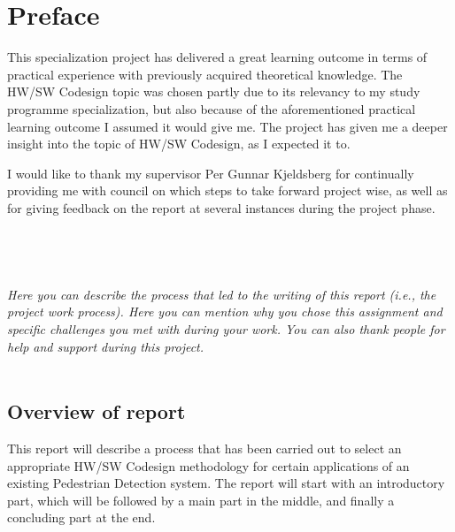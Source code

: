 \section*{Preface}
This specialization project has delivered a great learning outcome in terms of practical experience with previously acquired theoretical knowledge. The HW/SW Codesign topic was chosen partly due to its relevancy to my study programme specialization, but also because of the aforementioned practical learning outcome I assumed it would give me. The project has given me a deeper insight into the topic of HW/SW Codesign, as I expected it to.  \\
\noindent

\begin{comment}
Despite the learning outcome, the task accomplishment is less satisfactory than anticipated in terms of fulfillment of the project goals. The work process has often been slowed down due to specific tasks requiring more time to accomplish than anticipated, or due to encountering several unexpected problems in several areas related to the task that needed to be solved. Despite this, it is my belief that the accomplished results can be considered good enough in their own right.\\\\
\end{comment}

\noindent
I would like to thank my supervisor Per Gunnar Kjeldsberg for continually providing me with council on which steps to take forward project wise, as well as for giving feedback on the report at several instances during the project phase. \\\\\\\\


\noindent
\textit{\color{red}\\
Here you can describe the process that led to the writing of this report (i.e., the project work process). Here you can mention why you chose this assignment and specific challenges you met with during your work. You can also thank people for help and support during this project.}\\
\\
\noindent
\subsection{Overview of report}
This report will describe a process that has been carried out to select an appropriate HW/SW Codesign methodology for certain applications of an existing Pedestrian Detection system. The report will start with an introductory part, which will be followed by a main  part in the middle, and finally a concluding part at the end. 
\\
\noindent
